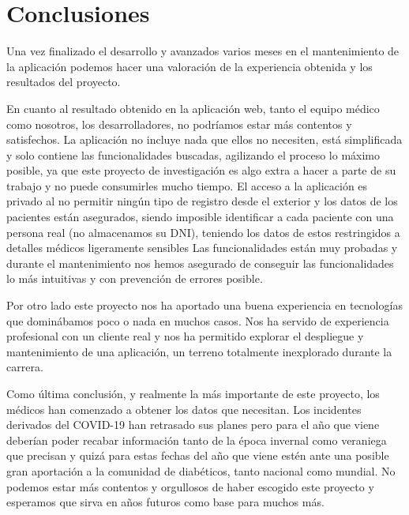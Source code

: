 \chapter{Conclusiones}
    
    Una vez finalizado el desarrollo y avanzados varios meses en el mantenimiento de la aplicación podemos hacer una valoración de la experiencia obtenida y los resultados del proyecto.
    \newline
    
    En cuanto al resultado obtenido en la aplicación web, tanto el equipo médico como nosotros, los desarrolladores, no podríamos estar más contentos y satisfechos. La aplicación no incluye nada que ellos no necesiten, está simplificada y solo contiene las funcionalidades buscadas, agilizando el proceso lo máximo posible, ya que este proyecto de investigación es algo extra a hacer a parte de su trabajo y no puede consumirles mucho tiempo.   El acceso a la aplicación es privado al no permitir ningún tipo de registro desde el exterior y los datos de los pacientes están asegurados, siendo imposible identificar a cada paciente con una persona real (no almacenamos su DNI), teniendo los datos de estos restringidos a detalles médicos ligeramente sensibles Las funcionalidades están muy probadas y durante el mantenimiento nos hemos asegurado de conseguir las funcionalidades lo más intuitivas y con prevención de errores posible.
    \newline
    
    Por otro lado este proyecto nos ha aportado una buena experiencia en tecnologías que dominábamos poco o nada en muchos casos. Nos ha servido de experiencia profesional con un cliente real y nos ha permitido explorar el despliegue y mantenimiento de una aplicación, un terreno totalmente inexplorado durante la carrera.
    \newline
    
    Como última conclusión, y realmente la más importante de este proyecto, los médicos han comenzado a obtener los datos que necesitan. Los incidentes derivados del COVID-19 han retrasado sus planes pero para el año que viene deberían poder recabar información tanto de la época invernal como veraniega que precisan y quizá para estas fechas del año que viene estén ante una posible gran aportación a la comunidad de diabéticos, tanto nacional como mundial. No podemos estar más contentos y orgullosos de haber escogido este proyecto y esperamos que sirva en años futuros como base para muchos más.